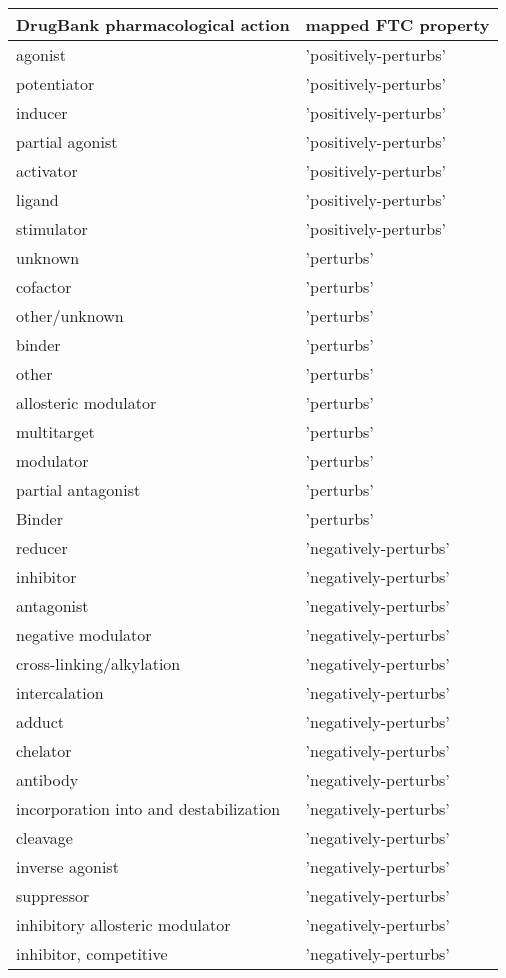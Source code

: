 \begin{center}
\small
    \begin{tabular}{| l | l |}
    \hline
\textbf{DrugBank pharmacological action} & \textbf{mapped FTC property} \\ \hline 
agonist & 'positively-perturbs'\\ \hline
potentiator & 'positively-perturbs'\\ \hline
inducer & 'positively-perturbs'\\ \hline 
partial agonist & 'positively-perturbs'\\ \hline 
activator & 'positively-perturbs'\\ \hline 
ligand & 'positively-perturbs'\\ \hline 
stimulator & 'positively-perturbs'\\ \hline 
unknown & 'perturbs'\\ \hline 
cofactor & 'perturbs'\\ \hline 
other/unknown & 'perturbs'\\ \hline 
binder & 'perturbs'\\ \hline 
other & 'perturbs'\\ \hline 
allosteric modulator & 'perturbs'\\ \hline 
multitarget & 'perturbs'\\ \hline 
modulator & 'perturbs'\\ \hline 
partial antagonist & 'perturbs'\\ \hline 
Binder & 'perturbs'\\ \hline 
reducer & 'negatively-perturbs'\\ \hline 
inhibitor & 'negatively-perturbs'\\ \hline 
antagonist & 'negatively-perturbs'\\ \hline 
negative modulator & 'negatively-perturbs'\\ \hline 
cross-linking/alkylation & 'negatively-perturbs'\\ \hline 
intercalation & 'negatively-perturbs'\\ \hline 
adduct & 'negatively-perturbs'\\ \hline 
chelator & 'negatively-perturbs'\\ \hline 
antibody & 'negatively-perturbs'\\ \hline 
incorporation into and destabilization & 'negatively-perturbs'\\ \hline 
cleavage & 'negatively-perturbs'\\ \hline 
inverse agonist & 'negatively-perturbs'\\ \hline 
suppressor & 'negatively-perturbs'\\ \hline 
inhibitory allosteric modulator & 'negatively-perturbs'\\ \hline 
inhibitor, competitive & 'negatively-perturbs'\\ \hline 
    \end{tabular} 
    \label{mappings}
\end{center}

